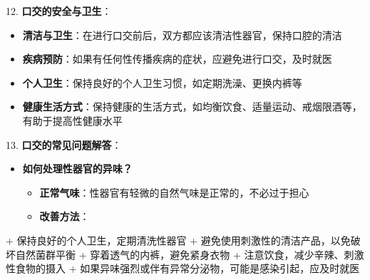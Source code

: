 \documentclass[12pt,UTF8]{ctexbook}
\begin{document}
12. \textbf{口交的安全与卫生}：
    \begin{itemize}
    \item \textbf{清洁与卫生}：在进行口交前后，双方都应该清洁性器官，保持口腔的清洁
    \item \textbf{疾病预防}：如果有任何性传播疾病的症状，应避免进行口交，及时就医
    \item \textbf{个人卫生}：保持良好的个人卫生习惯，如定期洗澡、更换内裤等
    \item \textbf{健康生活方式}：保持健康的生活方式，如均衡饮食、适量运动、戒烟限酒等，有助于提高性健康水平
    \end{itemize}

13. \textbf{口交的常见问题解答}：
    \begin{itemize}
    \item \textbf{如何处理性器官的异味？}
      \begin{itemize}
      \item \textbf{正常气味}：性器官有轻微的自然气味是正常的，不必过于担心
      \item \textbf{改善方法}：
      \end{itemize}
    \end{itemize}
        + 	保持良好的个人卫生，定期清洗性器官
        + 	避免使用刺激性的清洁产品，以免破坏自然菌群平衡
        + 	穿着透气的内裤，避免紧身衣物
        + 	注意饮食，减少辛辣、刺激性食物的摄入
        + 	如果异味强烈或伴有异常分泌物，可能是感染引起，应及时就医
\end{document}
